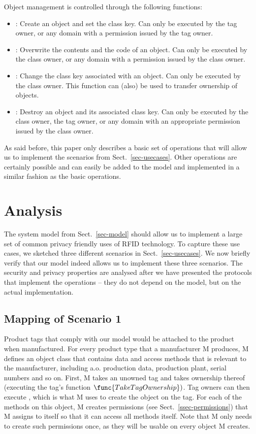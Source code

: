 Object management is controlled through the following functions:
\begin{itemize} 
\fixlistspacing
\item {}: Create an object and set the class key. Can only be executed by the tag owner, or any domain with a permission issued by the tag owner.
\item {}: Overwrite the contents and the code of an object. Can only be executed by the class owner, or any domain with a permission issued by the class owner.
\item {}: Change the class key associated with an object. Can only be executed by the class owner. This function can (also) be used to transfer ownership of objects.
\item {}: Destroy an object and its associated class key. Can only be executed by the class owner, the tag owner, or any domain with an appropriate permission issued by the class owner.
\end{itemize}
As said before, this paper only describes a basic set of operations that will
allow us to implement the scenarios from Sect.~\ref{sec-usecases}.
Other operations are certainly possible and can easily be added to the model
and implemented in a similar fashion as the basic operations.

\section{Analysis}
\label{sec-analysis}

The system model from Sect.~\ref{sec-model} should allow us to implement a
large set of common privacy friendly uses of RFID technology. To capture these
use cases, we sketch\-ed three different scenarios in Sect.~\ref{sec-usecases}.  
We now briefly verify that our model indeed allows us to implement these three
scenarios. The security and privacy properties are analysed after
we have presented the protocols that implement the operations -- they do not
depend on the model, but on the actual implementation.

\subsection{Mapping of Scenario 1}



Product tags that comply with our model would be attached to the product when
manufactured. For every product type that a manufacturer M produces, M defines
an object class  that contains data and access methods that is
relevant to the manufacturer, including a.o. production data, production plant,
serial numbers and so on. First, M takes an unowned tag and takes ownership
thereof (executing the tag's function $\func{TakeTagOwnership})$. 
Tag owners can then execute , which is what M uses to create
the  object on the tag.
For each of the methods on this object, 
M creates permissions (see Sect.~\ref{ssec-permissions}) that M assigns to
itself so that it can access all methods itself.
Note that M only needs to create such permissions once, as they will be
usable on every  object M creates.

